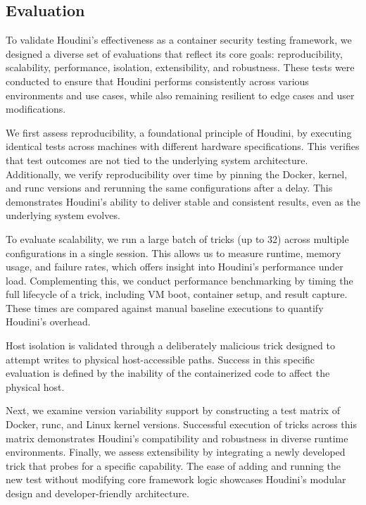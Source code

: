 \documentclass[12pt]{report}
\begin{document}
\begin{doublespace}
\chapter{Evaluation}

To validate Houdini’s effectiveness as a container security testing framework, we designed a diverse set of evaluations that reflect its core goals: reproducibility, scalability, performance, isolation, extensibility, and robustness. These tests were conducted to ensure that Houdini performs consistently across various environments and use cases, while also remaining resilient to edge cases and user modifications.

We first assess reproducibility, a foundational principle of Houdini, by executing identical tests across machines with different hardware specifications. This verifies that test outcomes are not tied to the underlying system architecture. Additionally, we verify reproducibility over time by pinning the Docker, kernel, and runc versions and rerunning the same configurations after a delay. This demonstrates Houdini’s ability to deliver stable and consistent results, even as the underlying system evolves.

To evaluate scalability, we run a large batch of tricks (up to 32) across multiple configurations in a single session. This allows us to measure runtime, memory usage, and failure rates, which offers insight into Houdini’s performance under load. Complementing this, we conduct performance benchmarking by timing the full lifecycle of a trick, including VM boot, container setup, and result capture. These times are compared against manual baseline executions to quantify Houdini’s overhead.

Host isolation is validated through a deliberately malicious trick designed to attempt writes to physical host-accessible paths. Success in this specific evaluation is defined by the inability of the containerized code to affect the physical host.

Next, we examine version variability support by constructing a test matrix of Docker, runc, and Linux kernel versions. Successful execution of tricks across this matrix demonstrates Houdini’s compatibility and robustness in diverse runtime environments. Finally, we assess extensibility by integrating a newly developed trick that probes for a specific capability. The ease of adding and running the new test without modifying core framework logic showcases Houdini’s modular design and developer-friendly architecture.


\end{doublespace}
\end{document}
